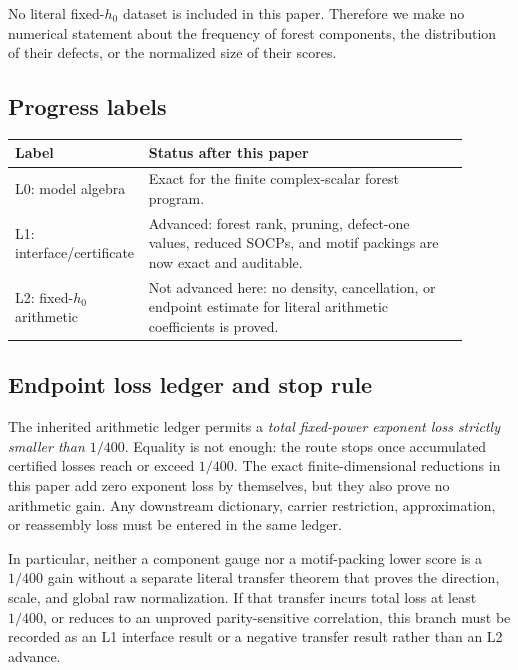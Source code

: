 No literal fixed-\(h_0\) dataset is included in this paper.  Therefore
we make no numerical statement about the frequency of forest
components, the distribution of their defects, or the normalized size
of their scores.

\subsection*{Progress labels}

\begin{center}
\begin{tabular}{@{}>{\raggedright\arraybackslash}p{0.20\linewidth}
>{\raggedright\arraybackslash}p{0.70\linewidth}@{}}
\toprule
Label & Status after this paper\\
\midrule
L0: model algebra &
Exact for the finite complex-scalar forest program.\\
L1: interface/certificate &
Advanced: forest rank, pruning, defect-one values, reduced SOCPs, and
motif packings are now exact and auditable.\\
L2: fixed-\(h_0\) arithmetic &
Not advanced here: no density, cancellation, or endpoint estimate for
literal arithmetic coefficients is proved.\\
\bottomrule
\end{tabular}
\end{center}

\subsection*{Endpoint loss ledger and stop rule}

The inherited arithmetic ledger permits a \emph{total fixed-power
exponent loss strictly smaller than \(1/400\)}.  Equality is not enough:
the route stops once accumulated certified losses reach or exceed
\(1/400\).  The exact finite-dimensional reductions in this paper add
zero exponent loss by themselves, but they also prove no arithmetic
gain.  Any downstream dictionary, carrier restriction, approximation,
or reassembly loss must be entered in the same ledger.

In particular, neither a component gauge nor a motif-packing lower
score is a \(1/400\) gain without a separate literal transfer theorem
that proves the direction, scale, and global raw normalization.  If
that transfer incurs total loss at least \(1/400\), or reduces to an
unproved parity-sensitive correlation, this branch must be recorded as
an L1 interface result or a negative transfer result rather than an L2
advance.

